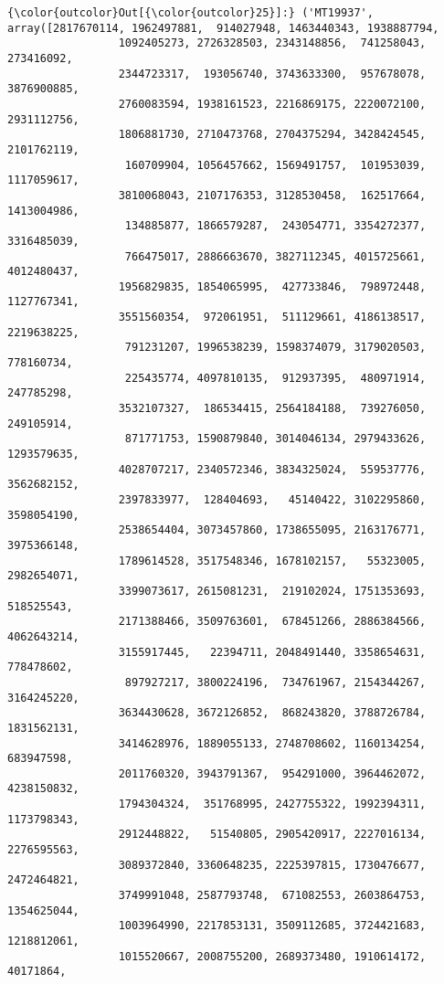 \documentclass[11pt]{article}
\begin{document}
\begin{Verbatim}[commandchars=\\\{\}]
{\color{outcolor}Out[{\color{outcolor}25}]:} ('MT19937', array([2817670114, 1962497881,  914027948, 1463440343, 1938887794,
                 1092405273, 2726328503, 2343148856,  741258043,  273416092,
                 2344723317,  193056740, 3743633300,  957678078, 3876900885,
                 2760083594, 1938161523, 2216869175, 2220072100, 2931112756,
                 1806881730, 2710473768, 2704375294, 3428424545, 2101762119,
                  160709904, 1056457662, 1569491757,  101953039, 1117059617,
                 3810068043, 2107176353, 3128530458,  162517664, 1413004986,
                  134885877, 1866579287,  243054771, 3354272377, 3316485039,
                  766475017, 2886663670, 3827112345, 4015725661, 4012480437,
                 1956829835, 1854065995,  427733846,  798972448, 1127767341,
                 3551560354,  972061951,  511129661, 4186138517, 2219638225,
                  791231207, 1996538239, 1598374079, 3179020503,  778160734,
                  225435774, 4097810135,  912937395,  480971914,  247785298,
                 3532107327,  186534415, 2564184188,  739276050,  249105914,
                  871771753, 1590879840, 3014046134, 2979433626, 1293579635,
                 4028707217, 2340572346, 3834325024,  559537776, 3562682152,
                 2397833977,  128404693,   45140422, 3102295860, 3598054190,
                 2538654404, 3073457860, 1738655095, 2163176771, 3975366148,
                 1789614528, 3517548346, 1678102157,   55323005, 2982654071,
                 3399073617, 2615081231,  219102024, 1751353693,  518525543,
                 2171388466, 3509763601,  678451266, 2886384566, 4062643214,
                 3155917445,   22394711, 2048491440, 3358654631,  778478602,
                  897927217, 3800224196,  734761967, 2154344267, 3164245220,
                 3634430628, 3672126852,  868243820, 3788726784, 1831562131,
                 3414628976, 1889055133, 2748708602, 1160134254,  683947598,
                 2011760320, 3943791367,  954291000, 3964462072, 4238150832,
                 1794304324,  351768995, 2427755322, 1992394311, 1173798343,
                 2912448822,   51540805, 2905420917, 2227016134, 2276595563,
                 3089372840, 3360648235, 2225397815, 1730476677, 2472464821,
                 3749991048, 2587793748,  671082553, 2603864753, 1354625044,
                 1003964990, 2217853131, 3509112685, 3724421683, 1218812061,
                 1015520667, 2008755200, 2689373480, 1910614172,   40171864,

\end{Verbatim}
\end{document}
